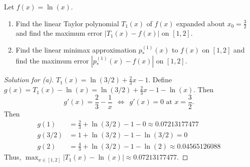 \documentclass[8pt]{article}
\theoremstyle{definition}
\newenvironment{exercise}[1]
  {\renewcommand\theinnerexercise{#1}\innerexercise}
  {\endinnerexercise}
\begin{document}
\begin{exercise}{5}
Let $f(x) = \ln (x)$.
\begin{enumerate}
\item[(a)] Find the linear Taylor polynomial $T_1 (x)$ of $f(x)$ expanded about $x_0 = \frac{3}{2}$ and find the maximum error $| T_1 (x) - f(x) |$ on $[1, 2]$.
\item[(b)] Find the linear minimax approximation $p_{*}^{(1)} (x)$ to $f(x)$ on $[1, 2]$ and find the maximum error $|p_{*}^{(1)} (x) - f(x)|$ on $[1, 2]$.	
\end{enumerate}	
\end{exercise}

\begin{proof}[Solution for (a)]
$T_1 (x) = \ln(3/2) + \frac{2}{3} x - 1$. Define $g(x) = T_1 (x) - \ln(x) = \ln(3/2) + \frac{2}{3} x - 1 - \ln(x)$. Then $$g'(x) = \frac{2}{3} - \frac{1}{x} \ \ \Longleftrightarrow \ \ g'(x) = 0 \text{ at } x = \frac{3}{2}.$$ Then 
\begin{align*}
g(1) &= \frac{2}{3} + \ln(3/2) - 1 - 0 \approx 0.07213177477 \\
g(3/2) &= 1 + \ln(3/2) - 1 - \ln(3/2) = 0 \\
g(2) &= \frac{4}{3} + \ln(3/2) - 1 - \ln(2) \approx 0.04565126088
\end{align*}
Thus, $\max_{x \in [1, 2]} | T_1(x) - \ln(x) | \approx 0.07213177477$.
\end{proof}
\end{document}
